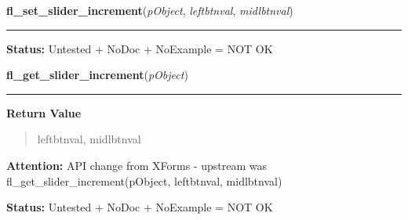     \label{xformslib:library:fl_set_slider_increment}

    \vspace{0.5ex}

\hspace{.8\funcindent}\begin{boxedminipage}{\funcwidth}

    \raggedright \textbf{fl\_set\_slider\_increment}(\textit{pObject}, \textit{leftbtnval}, \textit{midlbtnval})

    \vspace{-1.5ex}

    \rule{\textwidth}{0.5\fboxrule}
\setlength{\parskip}{2ex}
\setlength{\parskip}{1ex}
\textbf{Status:} Untested + NoDoc + NoExample = NOT OK



    \end{boxedminipage}

    \label{xformslib:library:fl_get_slider_increment}

    \vspace{0.5ex}

\hspace{.8\funcindent}\begin{boxedminipage}{\funcwidth}

    \raggedright \textbf{fl\_get\_slider\_increment}(\textit{pObject})

    \vspace{-1.5ex}

    \rule{\textwidth}{0.5\fboxrule}
\setlength{\parskip}{2ex}
\setlength{\parskip}{1ex}
      \textbf{Return Value}
    \vspace{-1ex}

      \begin{quote}
      leftbtnval, midlbtnval

      \end{quote}

\textbf{Attention:} API change from XForms - upstream was fl\_get\_slider\_increment(pObject, 
leftbtnval, midlbtnval)



\textbf{Status:} Untested + NoDoc + NoExample = NOT OK



    \end{boxedminipage}

